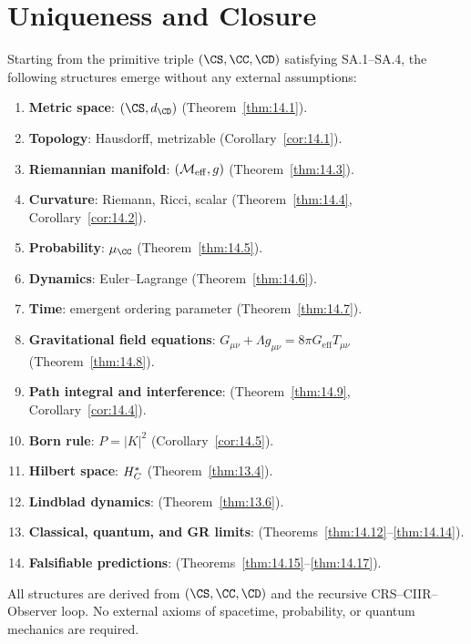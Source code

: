 \section{Uniqueness and Closure}
\label{sec:ch14:closure}

\begin{theorem}\label{thm:14.18}
Starting from the primitive triple $(\CS, \CC, \CD)$ satisfying
SA.1--SA.4, the following structures emerge without any external
assumptions:
\begin{enumerate}
  \item \textbf{Metric space}: $(\CS, d_{\CD})$
        (Theorem~\ref{thm:14.1}).
  \item \textbf{Topology}: Hausdorff, metrizable
        (Corollary~\ref{cor:14.1}).
  \item \textbf{Riemannian manifold}: $(\mathcal{M}_{\mathrm{eff}}, g)$
        (Theorem~\ref{thm:14.3}).
  \item \textbf{Curvature}: Riemann, Ricci, scalar
        (Theorem~\ref{thm:14.4}, Corollary~\ref{cor:14.2}).
  \item \textbf{Probability}: $\mu_{\CC}$
        (Theorem~\ref{thm:14.5}).
  \item \textbf{Dynamics}: Euler--Lagrange
        (Theorem~\ref{thm:14.6}).
  \item \textbf{Time}: emergent ordering parameter
        (Theorem~\ref{thm:14.7}).
  \item \textbf{Gravitational field equations}:
        $G_{\mu\nu} + \Lambda g_{\mu\nu} = 8\pi G_{\mathrm{eff}} T_{\mu\nu}$
        (Theorem~\ref{thm:14.8}).
  \item \textbf{Path integral and interference}:
        (Theorem~\ref{thm:14.9}, Corollary~\ref{cor:14.4}).
  \item \textbf{Born rule}: $P = |K|^2$
        (Corollary~\ref{cor:14.5}).
  \item \textbf{Hilbert space}: $H_C^*$
        (Theorem~\ref{thm:13.4}).
  \item \textbf{Lindblad dynamics}:
        (Theorem~\ref{thm:13.6}).
  \item \textbf{Classical, quantum, and GR limits}:
        (Theorems~\ref{thm:14.12}--\ref{thm:14.14}).
  \item \textbf{Falsifiable predictions}:
        (Theorems~\ref{thm:14.15}--\ref{thm:14.17}).
\end{enumerate}
All structures are derived from $(\CS, \CC, \CD)$ and the recursive
CRS--CIIR--Observer loop.  No external axioms of spacetime,
probability, or quantum mechanics are required.
\end{theorem}

